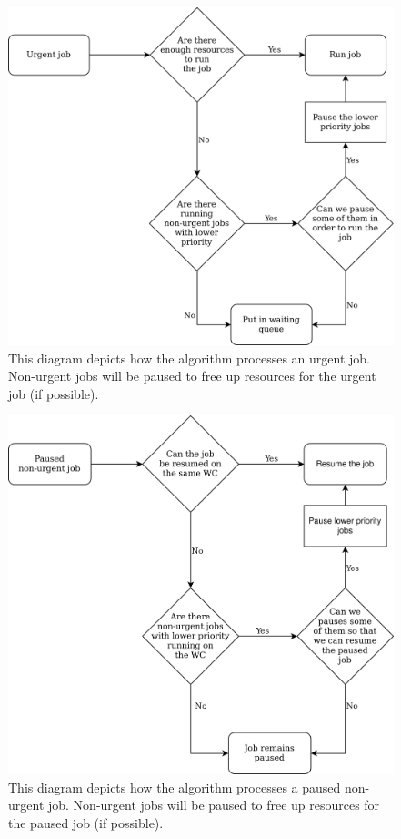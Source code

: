 \begin{figure}
  \centering
  \includegraphics[width=\textwidth]{./customer/diagrams/png/urgent-job.png}
  \caption{This diagram depicts how the algorithm processes an urgent job.
  Non-urgent jobs will be paused to free up resources for the urgent job (if possible).}
  \label{urgent}
\end{figure}
\begin{figure}
  \centering
  \includegraphics[width=\textwidth]{./customer/diagrams/png/paused-job.png}
  \caption{This diagram depicts how the algorithm processes a paused non-urgent job.
  Non-urgent jobs will be paused to free up resources for the paused job (if possible).}
  \label{paused}
\end{figure}

